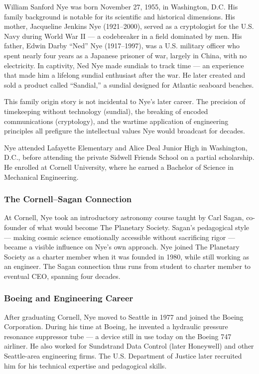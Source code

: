 \documentclass[11pt,letterpaper]{article}
\begin{document}
William Sanford Nye was born November 27, 1955, in Washington, D.C. His family background is notable for its scientific and historical dimensions. His mother, Jacqueline Jenkins Nye (1921--2000), served as a cryptologist for the U.S. Navy during World War II --- a codebreaker in a field dominated by men. His father, Edwin Darby ``Ned'' Nye (1917--1997), was a U.S. military officer who spent nearly four years as a Japanese prisoner of war, largely in China, with no electricity. In captivity, Ned Nye made sundials to track time --- an experience that made him a lifelong sundial enthusiast after the war. He later created and sold a product called ``Sandial,'' a sundial designed for Atlantic seaboard beaches.

This family origin story is not incidental to Nye's later career. The precision of timekeeping without technology (sundial), the breaking of encoded communications (cryptology), and the wartime application of engineering principles all prefigure the intellectual values Nye would broadcast for decades.

Nye attended Lafayette Elementary and Alice Deal Junior High in Washington, D.C., before attending the private Sidwell Friends School on a partial scholarship. He enrolled at Cornell University, where he earned a Bachelor of Science in Mechanical Engineering.

\subsubsection{The Cornell--Sagan Connection}

At Cornell, Nye took an introductory astronomy course taught by Carl Sagan, co-founder of what would become The Planetary Society. Sagan's pedagogical style --- making cosmic science emotionally accessible without sacrificing rigor --- became a visible influence on Nye's own approach. Nye joined The Planetary Society as a charter member when it was founded in 1980, while still working as an engineer. The Sagan connection thus runs from student to charter member to eventual CEO, spanning four decades.

\subsubsection{Boeing and Engineering Career}

After graduating Cornell, Nye moved to Seattle in 1977 and joined the Boeing Corporation. During his time at Boeing, he invented a hydraulic pressure resonance suppressor tube --- a device still in use today on the Boeing 747 airliner. He also worked for Sundstrand Data Control (later Honeywell) and other Seattle-area engineering firms. The U.S. Department of Justice later recruited him for his technical expertise and pedagogical skills.
\end{document}
